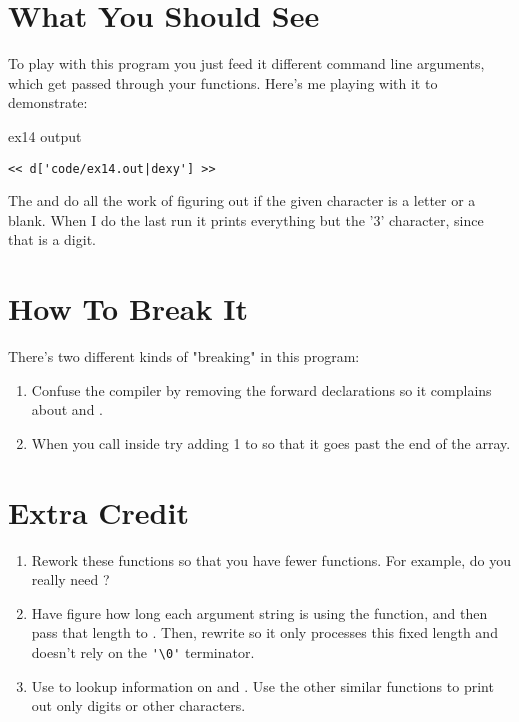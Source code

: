 \section{What You Should See}

To play with this program you just feed it different command line 
arguments, which get passed through your functions.  Here's me
playing with it to demonstrate:

\begin{code}{ex14 output}
\begin{lstlisting}
<< d['code/ex14.out|dexy'] >>
\end{lstlisting}
\end{code}

The  and  do all the work of figuring
out if the given character is a letter or a blank.  When I do the
last run it prints everything but the '3' character, since that 
is a digit.

\section{How To Break It}

There's two different kinds of "breaking" in this program:

\begin{enumerate}
\item Confuse the compiler by removing the forward declarations
    so it complains about  and .
\item When you call  inside  try
    adding 1 to  so that it goes past the end of the
     array.
\end{enumerate}


\section{Extra Credit}

\begin{enumerate}
\item Rework these functions so that you have fewer functions.  For example,
    do you really need ?
\item Have  figure how long each argument string
    is using the  function, and then pass that length
    to .  Then, rewrite  
    so it only processes this fixed length and doesn't rely on the
    \verb|'\0'| terminator.
\item Use  to lookup information on 
    and .  Use the other similar functions to
    print out only digits or other characters.
\end{enumerate}

